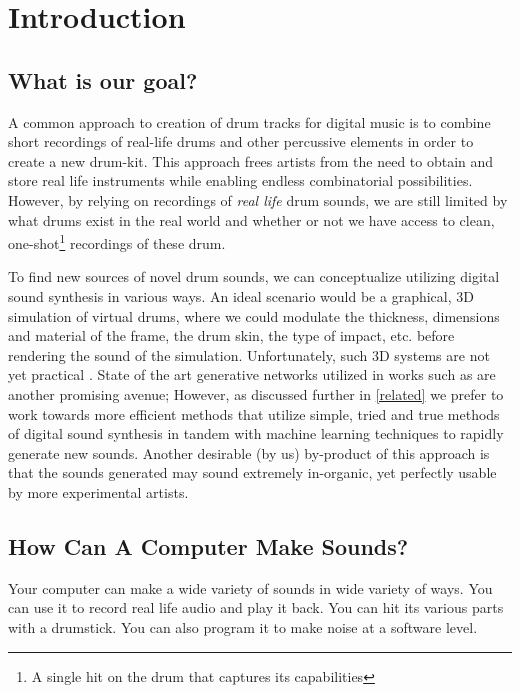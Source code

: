 \documentclass[\main/thesis.tex]{subfiles}
\begin{document}
\chapter{Introduction}
\section{What is our goal?}
A common approach to creation of drum tracks for digital music is to combine short recordings of real-life drums and other percussive elements in order to create a new drum-kit. This approach frees artists from the need to obtain and store real life instruments while enabling endless combinatorial possibilities. However, by relying on recordings of \textit{real life} drum sounds, we are still limited by what drums exist in the real world and whether or not we have access to clean, one-shot\footnote{A single hit on the drum that captures its capabilities} recordings of these drum. 

To find new sources of novel drum sounds, we can conceptualize utilizing digital sound synthesis in various ways. An ideal scenario would be a graphical, 3D simulation of virtual drums, where we could modulate the thickness, dimensions and material of the frame, the drum skin, the type of impact, etc. before rendering the sound of the simulation. Unfortunately, such 3D systems are not yet practical \cite{langlois2016toward}. State of the art generative networks utilized in works such as \cite{ramires2019timbfeat,aouameur2019neural} are another promising avenue; However, as discussed further in \ref{related} we prefer to work towards more efficient methods that utilize simple, tried and true methods of digital sound synthesis in tandem with machine learning techniques to rapidly generate new sounds. Another desirable (by us) by-product of this approach is that the sounds generated may sound extremely in-organic, yet perfectly usable by more experimental artists.

\section{How Can A Computer Make Sounds?}
Your computer can make a wide variety of sounds in wide variety of ways. You can use it to record real life audio and play it back. You can hit its various parts with a drumstick. You can also program it to make noise at a software level. 
\end{document}
